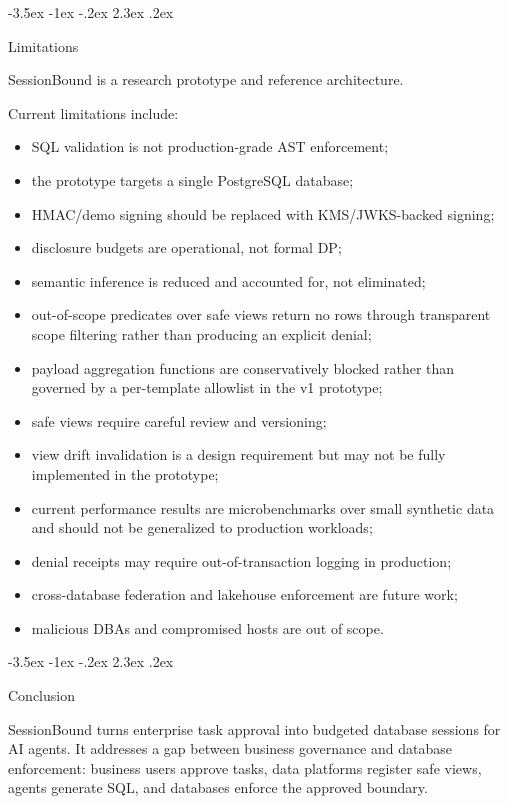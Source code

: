 \documentclass[10pt,twocolumn]{article}
\makeatletter
\providecommand{\tightlist}{%
  \setlength{\itemsep}{0pt}\setlength{\parskip}{0pt}}
\renewcommand\section{\@startsection{section}{1}{\z@}%
  {-3.5ex \@plus -1ex \@minus -.2ex}%
  {2.3ex \@plus .2ex}%
  {\normalfont\Large\bfseries\raggedright}}
\makeatother
\begin{document}
\hypertarget{limitations}{%
\section{Limitations}\label{limitations}}

SessionBound is a research prototype and reference architecture.

Current limitations include:

\begin{itemize}
\tightlist
\item
  SQL validation is not production-grade AST enforcement;
\item
  the prototype targets a single PostgreSQL database;
\item
  HMAC/demo signing should be replaced with KMS/JWKS-backed signing;
\item
  disclosure budgets are operational, not formal DP;
\item
  semantic inference is reduced and accounted for, not eliminated;
\item
  out-of-scope predicates over safe views return no rows through
  transparent scope filtering rather than producing an explicit denial;
\item
  payload aggregation functions are conservatively blocked rather than
  governed by a per-template allowlist in the v1 prototype;
\item
  safe views require careful review and versioning;
\item
  view drift invalidation is a design requirement but may not be fully
  implemented in the prototype;
\item
  current performance results are microbenchmarks over small synthetic
  data and should not be generalized to production workloads;
\item
  denial receipts may require out-of-transaction logging in production;
\item
  cross-database federation and lakehouse enforcement are future work;
\item
  malicious DBAs and compromised hosts are out of scope.
\end{itemize}

\hypertarget{conclusion}{%
\section{Conclusion}\label{conclusion}}

SessionBound turns enterprise task approval into budgeted database
sessions for AI agents. It addresses a gap between business governance
and database enforcement: business users approve tasks, data platforms
register safe views, agents generate SQL, and databases enforce the
approved boundary.
\end{document}
